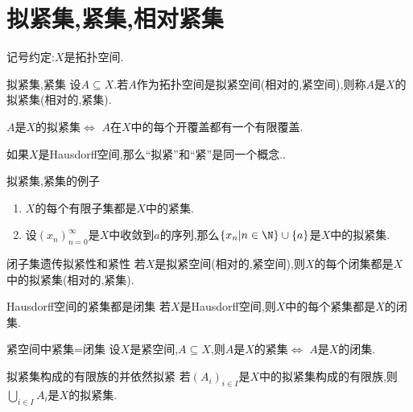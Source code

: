 \section{拟紧集,紧集,相对紧集}

记号约定:$X$是拓扑空间.

\begin{definition}{拟紧集,紧集}{}
	设$A\subseteq X$.若$A$作为拓扑空间是拟紧空间(相对的,紧空间),则称$A$是$X$的拟紧集(相对的,紧集).
\end{definition}

\begin{remark}{}{}
	$A$是$X$的拟紧集$\iff$ $A$在$X$中的每个开覆盖都有一个有限覆盖.
\end{remark}

\begin{remark}{}{}
	如果$X$是Hausdorff空间,那么``拟紧''和``紧''是同一个概念..
\end{remark}

\begin{example}{拟紧集,紧集的例子}{}
	\begin{enumerate}
		\item $X$的每个有限子集都是$X$中的紧集.
		\item 设$\left(x_{n}\right)_{n=0}^{\infty}$是$X$中收敛到$a$的序列,那么$\left\{x_{n}\middle|n\in\N\right\}\cup\left\{a\right\}$是$X$中的拟紧集.
	\end{enumerate}
\end{example}

\begin{proposition}{闭子集遗传拟紧性和紧性}{}
	若$X$是拟紧空间(相对的,紧空间),则$X$的每个闭集都是$X$中的拟紧集(相对的,紧集).
\end{proposition}

\begin{proposition}{Hausdorff空间的紧集都是闭集}{}
	若$X$是Hausdorff空间,则$X$中的每个紧集都是$X$的闭集.
\end{proposition}

\begin{corollary}{紧空间中紧集=闭集}{}
	设$X$是紧空间,$A\subseteq X$,则$A$是$X$的紧集$\iff$ $A$是$X$的闭集.
\end{corollary}

\begin{proposition}{拟紧集构成的有限族的并依然拟紧}{}
	若$\left(A_{i}\right)_{i\in I}$是$X$中的拟紧集构成的有限族,则$\bigcup\limits_{i\in I}A_{i}$是$X$的拟紧集.
\end{proposition}

